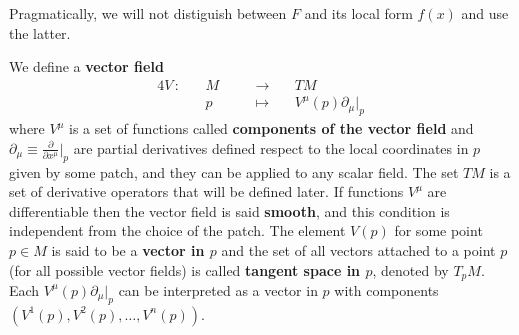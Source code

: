 \documentclass[../main/main.tex]{subfiles}
\begin{document}
Pragmatically, we will not distiguish between $F$ and its local form $f(x)$ and use the latter.
%
\begin{definition}{}
We define a \textbf{vector field}
\begin{alignat*}{4}
V\,:\,&&M&&\quad\longrightarrow\quad&TM\\
&&p&&\quad\longmapsto\quad& V^\mu(p)\partial_\mu\big\vert_p
\end{alignat*}
where $V^\mu$ is a set of  functions called \textbf{components of the vector field} and $\partial_\mu\equiv\frac\partial{\partial x^\mu}\vert_p$ are partial derivatives defined respect to the local coordinates in $p$ given by some patch, and they can be applied to any scalar field. The set $TM$ is a set of derivative operators that will be defined later. If functions $V^\mu$ are differentiable then the vector field is said \textbf{smooth}, and this condition is independent from the choice of the patch. The element $V(p)$ for some point $p\in M$ is said to be a  \textbf{vector in $p$} and the set of all vectors attached to a point $p$ (for all possible vector fields) is called \textbf{tangent space in $p$}, denoted by $T_pM$. Each $V^\mu(p)\partial_\mu\vert_p$ can be interpreted as a vector in $p$ with components $(V^1(p),V^2(p),\dots,V^n(p))$.


\end{definition}
\end{document}
